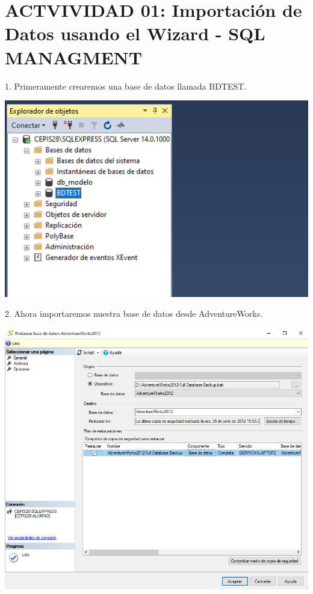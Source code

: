 \section{ACTVIVIDAD 01: Importación de Datos usando el Wizard - SQL MANAGMENT}  

1. Primeramente crearemos una base de datos llamada BDTEST.
	\begin{center}
	\includegraphics[width=\columnwidth]{images/task1/img1}
	\end{center}	


2. Ahora importaremos nuestra base de datos desde AdventureWorks.
	\begin{center}
	\includegraphics[width=\columnwidth]{images/task1/img2}
	\end{center}	


